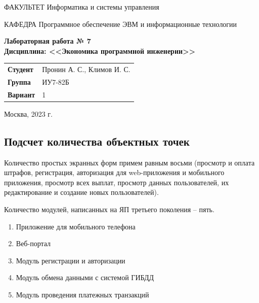 \documentclass[a4paper,14pt]{article}
\begin{document}
\begin{titlepage}
    \begin{flushleft}
        ФАКУЛЬТЕТ Информатика и системы управления
    \end{flushleft}
    КАФЕДРА Программное обеспечение ЭВМ и информационные технологии

    \vspace{3cm}

    \begin{center}
        \textbf{Лабораторная работа № 7} \\
        \textbf{Дисциплина: <<Экономика программной инженерии>>}
        \vspace{0.5cm}
    \end{center}


    \vspace{3cm}

    \begin{flushleft}
        \begin{tabular}{ll}
            \textbf{Студент}       & Пронин А. С., Климов И. С. \\
            \textbf{Группа}        & ИУ7-82Б           \\
            \textbf{Вариант}       & 1           \\
        \end{tabular}
    \end{flushleft}

    \vspace{3cm}

    \begin{center}
        Москва, 2023 г.
    \end{center}

\end{titlepage}

\setcounter{page}{2}

\subsection*{Подсчет количества объектных точек}

Количество простых экранных форм примем равным восьми (просмотр и оплата штрафов, регистрация, авторизация для web-приложения и мобильного приложения, просмотр всех выплат, просмотр данных пользователей, их редактирование и создание новых пользователей).

Количество модулей, написанных на ЯП третьего поколения -- пять.
\begin{enumerate}
    \item Приложение для мобильного телефона
    \item Веб-портал
    \item Модуль регистрации и авторизации
    \item Модуль обмена данными с системой ГИБДД
    \item Модуль проведения платежных транзакций
\end{enumerate}
\end{document}
